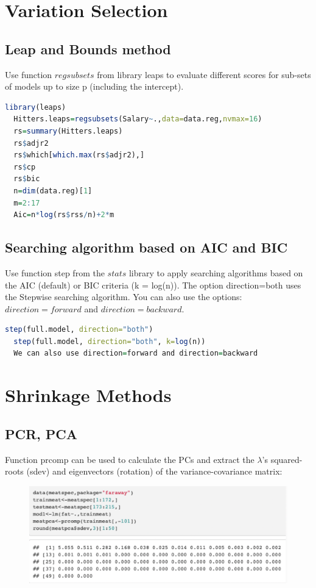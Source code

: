 \documentclass[11pt,a4paper]{article}
\begin{document}
\section{Variation Selection}
\subsection{Leap and Bounds method}
Use function $regsubsets$ from library leaps to evaluate different scores for sub-sets of models up to size p (including the intercept).
\begin{lstlisting}[language=R]
  library(leaps)
  Hitters.leaps=regsubsets(Salary~.,data=data.reg,nvmax=16)
  rs=summary(Hitters.leaps)
  rs$adjr2
  rs$which[which.max(rs$adjr2),]
  rs$cp
  rs$bic
  n=dim(data.reg)[1]
  m=2:17
  Aic=n*log(rs$rss/n)+2*m
\end{lstlisting}
\subsection{Searching algorithm based on AIC and BIC}
Use function step from the $stats$ library to apply searching algorithms based on the AIC (default) or BIC criteria (k = log(n)). The option direction=both uses the Stepwise searching algorithm. You can also use the options: $direction=forward$ and $direction=backward$.
\begin{lstlisting}[language=R]
  step(full.model, direction="both")
  step(full.model, direction="both", k=log(n))
  We can also use direction=forward and direction=backward
\end{lstlisting}



\section{Shrinkage Methods}
\subsection{PCR, PCA}
Function prcomp can be used to calculate the PCs and extract the $\lambda$’s squared-roots (sdev) and eigenvectors (rotation) of the variance-covariance matrix:
\begin{center}\begin{figure}[htbp]
  \centering
  \includegraphics[scale=0.5]{prcomp}
  \caption{}
  \label{}
\end{figure}\end{center}
\end{document}
